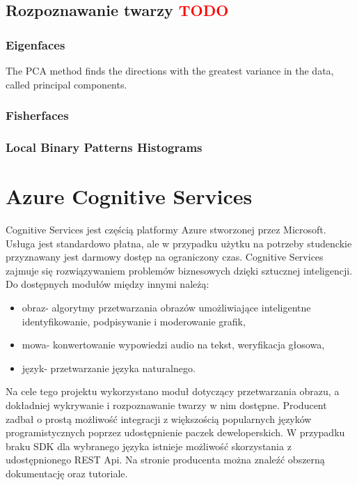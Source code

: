 \subsection{Rozpoznawanie twarzy \textcolor{red}{TODO}}
\subsubsection{Eigenfaces} \label{eigen}
The PCA method finds the directions with the greatest variance in the data, called principal components.
\subsubsection{Fisherfaces} \label{fisher}
\subsubsection{Local Binary Patterns Histograms} \label{lbph}

\section{Azure Cognitive Services}
Cognitive Services jest częścią platformy Azure stworzonej przez Microsoft. Usługa jest standardowo płatna, ale w przypadku użytku na potrzeby studenckie przyznawany jest darmowy dostęp na ograniczony czas. Cognitive Services zajmuje się rozwiązywaniem problemów biznesowych dzięki sztucznej inteligencji. Do dostępnych modułów między innymi należą:
\begin{itemize}
\item obraz- algorytmy przetwarzania obrazów umożliwiające inteligentne identyfikowanie, podpisywanie i moderowanie grafik,
\item mowa- konwertowanie wypowiedzi audio na tekst, weryfikacja głosowa,
\item język- przetwarzanie języka naturalnego.
\end{itemize}
Na cele tego projektu wykorzystano moduł dotyczący przetwarzania obrazu, a dokładniej wykrywanie i rozpoznawanie twarzy w nim dostępne. Producent zadbał o prostą możliwość integracji z większością popularnych języków programistycznych poprzez udostępnienie paczek deweloperskich. W przypadku braku SDK dla wybranego języka istnieje możliwość skorzystania z udostępnionego REST Api. Na stronie producenta można znaleźć obszerną dokumentację oraz tutoriale.
